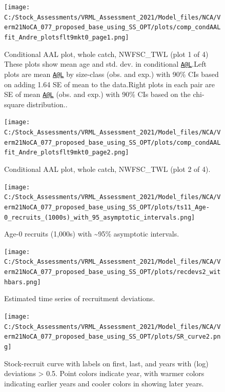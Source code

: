 \documentclass[11pt,
  english,
  a4paper,
]{article}
\begin{document}
\begin{figure}
\centering
\texttt{[image: C:/Stock\_Assessments/VRML\_Assessment\_2021/Model\_files/NCA/Verm21NoCA\_077\_proposed\_base\_using\_SS\_OPT/plots/comp\_condAALfit\_Andre\_plotsflt9mkt0\_page1.png]}
\caption{Conditional AAL plot, whole catch, NWFSC\_TWL (plot 1 of 4) These plots show mean age and std. dev. in conditional {\href{mailto:A@L}{\nolinkurl{A@L}}\leavevmode\tagmcend\tagstructend}.Left plots are mean {\href{mailto:A@L}{\nolinkurl{A@L}}\leavevmode\tagmcend\tagstructend} by size-class (obs. and exp.) with 90\% CIs based on adding 1.64 SE of mean to the data.Right plots in each pair are SE of mean {\href{mailto:A@L}{\nolinkurl{A@L}}\leavevmode\tagmcend\tagstructend} (obs. and exp.) with 90\% CIs based on the chi-square distribution..\label{fig:comp_condAALfit_Andre_plotsflt9mkt0_page1}}
\end{figure}

\begin{figure}
\centering
\texttt{[image: C:/Stock\_Assessments/VRML\_Assessment\_2021/Model\_files/NCA/Verm21NoCA\_077\_proposed\_base\_using\_SS\_OPT/plots/comp\_condAALfit\_Andre\_plotsflt9mkt0\_page2.png]}
\caption{Conditional AAL plot, whole catch, NWFSC\_TWL (plot 2 of 4).\label{fig:comp_condAALfit_Andre_plotsflt9mkt0_page2}}
\end{figure}

\FloatBarrier

\begin{figure}
\centering
\texttt{[image: C:/Stock\_Assessments/VRML\_Assessment\_2021/Model\_files/NCA/Verm21NoCA\_077\_proposed\_base\_using\_SS\_OPT/plots/ts11\_Age-0\_recruits\_(1000s)\_with\_95\_asymptotic\_intervals.png]}
\caption{Age-0 recruits (1,000s) with \textasciitilde95\% asymptotic intervals.\label{fig:recruits}}
\end{figure}

\begin{figure}
\centering
\texttt{[image: C:/Stock\_Assessments/VRML\_Assessment\_2021/Model\_files/NCA/Verm21NoCA\_077\_proposed\_base\_using\_SS\_OPT/plots/recdevs2\_withbars.png]}
\caption{Estimated time series of recruitment deviations.\label{fig:rec-devs}}
\end{figure}

\begin{figure}
\centering
\texttt{[image: C:/Stock\_Assessments/VRML\_Assessment\_2021/Model\_files/NCA/Verm21NoCA\_077\_proposed\_base\_using\_SS\_OPT/plots/SR\_curve2.png]}
\caption{Stock-recruit curve with labels on first, last, and years with (log) deviations \textgreater{} 0.5. Point colors indicate year, with warmer colors indicating earlier years and cooler colors in showing later years.\label{fig:bh-curve}}
\end{figure}
\end{document}
